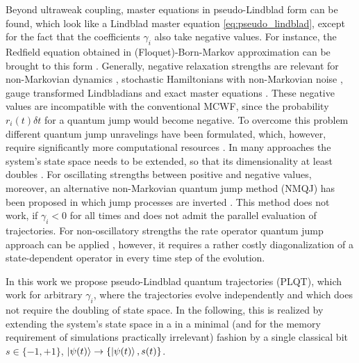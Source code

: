 \documentclass[twocolumn,prl,superscriptaddress]{revtex4-2}
\begin{document}
Beyond ultraweak coupling, master equations in pseudo-Lindblad form can be found, which look like a Lindblad master equation \cref{eq:pseudo_lindblad}, except for the fact that the coefficients $\gamma_i$ also take negative values. For instance, the Redfield equation obtained in (Floquet)-Born-Markov approximation can be brought to this form \cite{TBecker2021}. Generally, negative relaxation strengths are relevant for non-Markovian dynamics \cite{DCruscinskiJPiiloWStrunz2017}, stochastic Hamiltonians with non-Markovian noise \cite{Groszkowski2022}, gauge transformed Lindbladians \cite{McDonaldClerk2023arxiv} and exact master equations \cite{KarrleinGrabert97,AShajiECGSudarshan2005,SAlipour2020}. These negative values are incompatible with the conventional MCWF, since the probability $r_i(t) \delta t$ for a quantum jump would become negative. To overcome this problem different quantum jump unravelings have been formulated, which, however, require significantly more computational resources \cite{breuerpetruccione1999,IKondovMschreiber2003,breuer2004,SuessEisfeldStrunz2014,MRHush2015,Piilo2009,KHaerkoenen_2010,KLuoma2020,SmirnePiilo2020}. In many approaches the system’s state space needs to be extended, so that its dimensionality at least doubles \cite{breuerpetruccione1999,IKondovMschreiber2003,breuer2004,ChinRivasHuelgaPlenio2010,SuessEisfeldStrunz2014,MRHush2015,StrasbergSchallerBrandes2016,PolettiSchaller2021}. For oscillating strengths between positive and negative values, moreover, an alternative non-Markovian quantum jump method (NMQJ) has been proposed in which jump processes are inverted \cite{Piilo2009,KHaerkoenen_2010,KLuoma2020}. This method does not work, if $\gamma_i<0$ for all times and does not admit the parallel evaluation of trajectories. For non-oscillatory strengths the rate operator quantum jump approach can be applied \cite{SmirnePiilo2020}, however, it requires a rather costly diagonalization of a state-dependent operator in every time step of the evolution.

In this work we propose pseudo-Lindblad quantum trajectories (PLQT), which work for arbitrary $\gamma_i$, where the trajectories evolve independently and which does not require the doubling of state space. In the following, this is realized by extending the system’s state space in a in a minimal (and for the memory requirement of simulations practically irrelevant) fashion by a single classical bit $s\in\{-1,+1\}$, $\ket{\psi(t)} \to \{\ket{\psi(t)}, s(t)\}$. 
\end{document}
